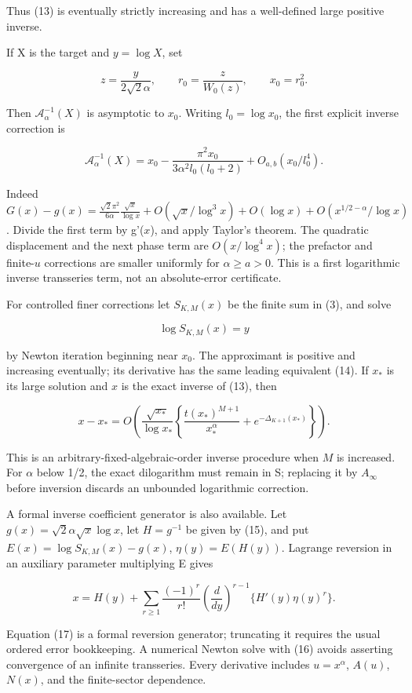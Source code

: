 \documentclass[11pt,letterpaper]{article}
\begin{document}
Thus (13) is eventually strictly increasing and has a well-defined large
positive inverse.

If X is the target and \(y=\log X\), set

\[
 z=\frac{y}{2\sqrt2\alpha},\qquad r_0=\frac z{W_0(z)},\qquad x_0=r_0^2. \tag{15}
\]

Then \(\mathcal A_\alpha^{-1}(X)\) is asymptotic to \(x_0\). Writing
\(l_0=\log x_0\), the first explicit inverse correction is

\[
 \mathcal A_\alpha^{-1}(X)
 =x_0-\frac{\pi^2x_0}{3\alpha^2l_0(l_0+2)}
 +O_{a,b}(x_0/l_0^4). \tag{15a}
\]

Indeed
\(G(x)-g(x)=\frac{\sqrt2\pi^2}{6\alpha}\frac{\sqrt x}{\log x}+O(\sqrt x/\log^3x)+O(\log x)+O(x^{1/2-\alpha}/\log x)\).
Divide the first term by g'(\(x\)), and apply Taylor's theorem. The
quadratic displacement and the next phase term are \(O(x/\log^4x)\); the
prefactor and finite-\(u\) corrections are smaller uniformly for
\(\alpha\ge a>0\). This is a first logarithmic inverse transseries term,
not an absolute-error certificate.

For controlled finer corrections let \(S_{K,M}(x)\) be the finite sum in
(3), and solve

\[
 \log S_{K,M}(x)=y
\]

by Newton iteration beginning near \(x_0\). The approximant is positive
and increasing eventually; its derivative has the same leading
equivalent (14). If \(x_*\) is its large solution and \(x\) is the exact
inverse of (13), then

\[
 x-x_*=O\left(\frac{\sqrt{x_*}}{\log x_*}
 \left\{\frac{t(x_*)^{M+1}}{x_*^\alpha}+e^{-\Delta_{K+1}(x_*)}\right\}\right). \tag{16}
\]

This is an arbitrary-fixed-algebraic-order inverse procedure when \(M\)
is increased. For \(\alpha\) below 1/2, the exact dilogarithm must
remain in S; replacing it by \(A_\infty\) before inversion discards an
unbounded logarithmic correction.

A formal inverse coefficient generator is also available. Let
\(g(x)=\sqrt2\alpha\sqrt x\log x\), let \(H=g^{-1}\) be given by (15),
and put \(E(x)=\log S_{K,M}(x)-g(x)\), \(\eta(y)=E(H(y))\). Lagrange
reversion in an auxiliary parameter multiplying E gives

\[
 x=H(y)+\sum_{r\ge1}\frac{(-1)^r}{r!}
 \left(\frac d{dy}\right)^{r-1}\{H'(y)\eta(y)^r\}. \tag{17}
\]

Equation (17) is a formal reversion generator; truncating it requires
the usual ordered error bookkeeping. A numerical Newton solve with (16)
avoids asserting convergence of an infinite transseries. Every
derivative includes \(u=x^\alpha\), \(A(u)\), \(N(x)\), and the
finite-sector dependence.
\end{document}
